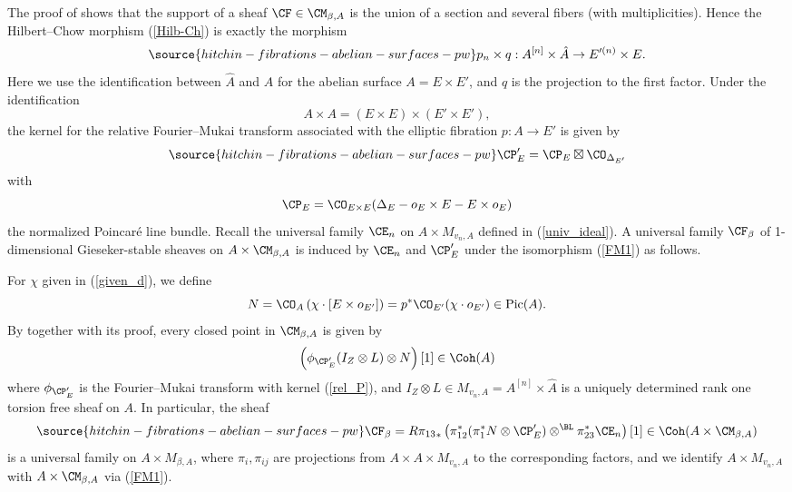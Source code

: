 The proof of \cite[Theorem 3.15]{Yo} shows that the support of a sheaf $\CF \in \CM_{\beta, A}$ is the union of a section and several fibers (with multiplicities). Hence the Hilbert--Chow morphism (\ref{Hilb-Ch}) is exactly the morphism
\begin{equation}\label{HC2}
\source{hitchin-fibrations-abelian-surfaces-pw}
p_n\times q: A^{[n]} \times \hat{A} \to E'^{(n)} \times E.
\end{equation}
Here we use the identification between $\hat{A}$ and $A$ for the abelian surface $A= E \times E'$, and $q$ is the projection to the first factor.  Under the identification
\[
A \times A = (E \times E) \times (E'\times E'),
\]
the kernel for the relative Fourier--Mukai transform associated with the elliptic fibration $p: A \to E'$ is given by
\begin{equation}\label{rel_P}
\source{hitchin-fibrations-abelian-surfaces-pw}
\CP'_E = \CP_E \boxtimes \CO_{\Delta_{E'}}
\end{equation}
with
\[
\CP_E = \CO_{E\times E}(\Delta_E - o_{E}\times E - E\times o_E)
\]
the normalized Poincar\'e line bundle. Recall the universal family $\CE_n$ on $A \times M_{v_n,A}$ defined in (\ref{univ_ideal}). A universal family $\CF_\beta$ of 1-dimensional Gieseker-stable sheaves on $A \times \CM_{\beta,A}$ is induced by $\CE_n$ and $\CP_E'$ under the isomorphism (\ref{FM1}) as follows.

For $\chi$ given in (\ref{given_d}), we define
\[
N= \CO_A\left(\chi \cdot [E\times o_{E'}]\right) = p^*\CO_{E'}(\chi \cdot o_{E'}) \in \mathrm{Pic}(A).
\]
By \cite[Theorem 3.15]{Yo} together with its proof, every closed point in $\CM_{\beta,A}$ is given by
\[
\left(\phi_{\CP'_E}(I_Z\otimes L) \otimes N\right) [1] \in \Coh(A)
\]
where $\phi_{\CP'_E}$ is the Fourier--Mukai transform with  kernel (\ref{rel_P}), and $I_Z\otimes L \in M_{v_n,A}=A^{[n]} \times \hat{A}$  is a uniquely determined  rank one torsion free sheaf on $A$. In particular, the sheaf
\begin{equation}\label{univ2}
\source{hitchin-fibrations-abelian-surfaces-pw}
\CF_\beta = {R\pi_{13}}_\ast \left( \pi_{12}^\ast (\pi_1^*N\otimes{\CP'_{E}}) \otimes^{\BL} \pi_{23}^\ast \CE_n \right)[1] \in \Coh(A \times \CM_{\beta,A})
\end{equation}
is a universal family on $A \times M_{\beta,A}$, where $\pi_i, \pi_{ij}$ are projections from $A \times A \times M_{v_n,A}$ to the corresponding factors, and we identify $A \times M_{v_n,A}$ with $A \times \CM_{\beta,A}$ via (\ref{FM1}).

